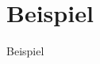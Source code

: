 \section{Beispiel}

Beispiel


\cite{inproceedings}

\cite{article}

\cite{patent}

\cite{book}

\cite{electronic}